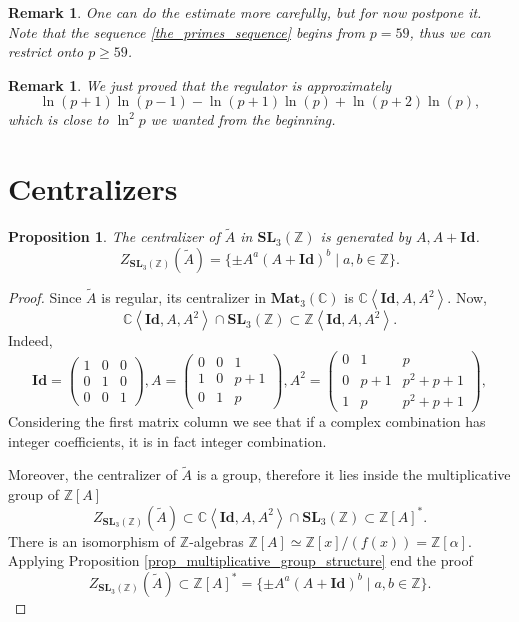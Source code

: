 \documentclass[a4paper]{article}
\newtheorem{Prop}[Thm]{Proposition}
\newtheorem{Rem}[Thm]{Remark}
\newcommand{\C}{\mathbb{C}}        %
\newcommand{\Id}{\mathbf{Id}}        %
\newcommand{\SL}{\mathbf{SL}_3(\mathbb{Z})}        %
\newcommand{\Mat}{\mathbf{Mat}_3(\mathbb{C})}        %
\begin{document}
\begin{Rem}
One can do the estimate more carefully, but for now postpone it. 
Note that the sequence \ref{the_primes_sequence} begins from $p = 59$, thus we can restrict onto $p \ge 59$.
\end{Rem}
\begin{Rem}
We just proved that the regulator is approximately 
\[
\ln(p + 1) \ln(p - 1) - \ln(p + 1) \ln(p) + \ln(p + 2) \ln(p)
,\] 
which is close to $\ln^2 p$ we wanted from the beginning.
\end{Rem}


\section{Centralizers}
\begin{Prop}
	\label{proposition_centralizer_in_sl}
The centralizer of $\tilde A$ in $\SL$
is generated by $A, A+\Id$.
$$Z_{\SL}(\tilde A) = \{ \pm A^a (A + \Id)^b \mid a, b \in \mathbb{Z} \} .$$ 
\end{Prop}
\begin{proof}
Since $\tilde A$ is regular, its centralizer in $ \Mat $ is $\C \left< \Id, A, A^2 \right> $.
Now, 
\[
\C \left< \Id, A, A^2 \right> \cap \SL 
\subset \mathbb{Z} 
\left< \Id, A, A^2 \right>
.\] 
Indeed,
\begin{equation}
\Id = 
\begin{pmatrix}
1 & 0 & 0 \\
0 & 1 & 0 \\
0 & 0 & 1
\end{pmatrix}, 
A = 
\begin{pmatrix}
0 & 0 & 1 \\
1 & 0 & p+1 \\
0 & 1 & p
\end{pmatrix}, 
A^2 = 
\begin{pmatrix}
0 & 1 & p \\
0 & p+1 & p^2+p+1 \\
1 & p & p^2+p+1
\end{pmatrix}, 
\end{equation}
Considering the first matrix column we see that if a complex combination has integer coefficients, it is in fact integer combination.

Moreover, 
the centralizer of $\tilde A$ is a group, therefore it lies inside the multiplicative group of $\mathbb{Z}[A]$
\[
Z_{\SL}(\tilde A)  \subset 
\C \left< \Id, A, A^2 \right> \cap \SL 
\subset \mathbb{Z}[A]^*
.\] 
There is an isomorphism of $\mathbb{Z}$-algebras $\mathbb{Z}[A] \simeq \mathbb{Z}[x]/(f(x)) = \mathbb{Z}[\alpha]$.
Applying Proposition \ref{prop_multiplicative_group_structure} end the proof
\[
Z_{\SL}(\tilde A) 
\subset \mathbb{Z}[A]^* =\{ \pm A^a (A + \Id)^b \mid a, b \in \mathbb{Z} \}.\] 
\end{proof}
\end{document}
